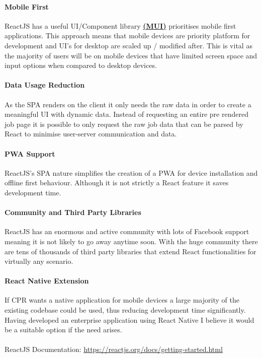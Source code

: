 \paragraph{Mobile First}
ReactJS has a useful UI/Component library \textbf{\href{https://mui.com/}{(MUI)}} prioritises mobile first applications.
This approach means that mobile devices are priority platform for development and UI's for desktop are scaled up / modified after.
This is vital as the majority of users will be on mobile devices that have limited screen space and input options when compared
to desktop devices.

\paragraph{Data Usage Reduction}
As the SPA renders on the client it only needs the raw data in order to create a meaningful UI with dynamic data.
Instead of requesting an entire pre rendered job page it is possible to only request the raw job data that can be parsed
by React to minimise user-server communication and data.

\paragraph{PWA Support}
ReactJS's SPA nature simplifies the creation of a PWA for device installation and offline first behaviour.
Although it is not strictly a React feature it saves development time.

\paragraph{Community and Third Party Libraries}
ReactJS has an enormous and active community with lots of Facebook support meaning it is not likely to go away anytime soon.
With the huge community there are tens of thousands of third party libraries that extend React functionalities for virtually any
scenario.

\paragraph{React Native Extension} If CPR wants a native application for mobile devices a large majority of the existing codebase
could be used, thus reducing development time significantly.
Having developed an enterprise application using React Native I believe it would be a suitable option if the need arises.


\paragraph{} ReactJS Documentation: \url{https://reactjs.org/docs/getting-started.html}

